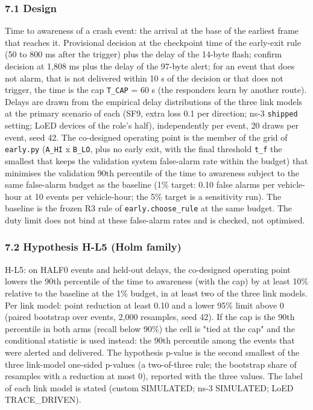 \subsubsection*{7.1 Design}

Time to awareness of a crash event: the arrival at the base of the earliest frame that reaches it. Provisional decision at the checkpoint time of the early-exit rule (50 to 800 ms after the trigger) plus the delay of the 14-byte flash; confirm decision at 1,808 ms plus the delay of the 97-byte alert; for an event that does not alarm, that is not delivered within 10 s of the decision or that does not trigger, the time is the cap \texttt{T\_CAP} = 60 s (the responders learn by another route). Delays are drawn from the empirical delay distributions of the three link models at the primary scenario of each (SF9, extra loss 0.1 per direction; ns-3 \texttt{shipped} setting; LoED devices of the role's half), independently per event, 20 draws per event, seed 42. The co-designed operating point is the member of the grid of \texttt{early.py} (\texttt{A\_HI} x \texttt{B\_LO}, plus no early exit, with the final threshold \texttt{t\_f} the smallest that keeps the validation system false-alarm rate within the budget) that minimises the validation 90th percentile of the time to awareness subject to the same false-alarm budget as the baseline (1\% target: 0.10 false alarms per vehicle-hour at 10 events per vehicle-hour; the 5\% target is a sensitivity run). The baseline is the frozen R3 rule of \texttt{early.choose\_rule} at the same budget. The duty limit does not bind at these false-alarm rates and is checked, not optimised.

\subsubsection*{7.2 Hypothesis H-L5 (Holm family)}

H-L5: on HALF0 events and held-out delays, the co-designed operating point lowers the 90th percentile of the time to awareness (with the cap) by at least 10\% relative to the baseline at the 1\% budget, in at least two of the three link models. Per link model: point reduction at least 0.10 and a lower 95\% limit above 0 (paired bootstrap over events, 2,000 resamples, seed 42). If the cap is the 90th percentile in both arms (recall below 90\%) the cell is "tied at the cap" and the conditional statistic is used instead: the 90th percentile among the events that were alerted and delivered. The hypothesis p-value is the second smallest of the three link-model one-sided p-values (a two-of-three rule; the bootstrap share of resamples with a reduction at most 0), reported with the three values. The label of each link model is stated (custom SIMULATED; ns-3 SIMULATED; LoED TRACE\_DRIVEN).

